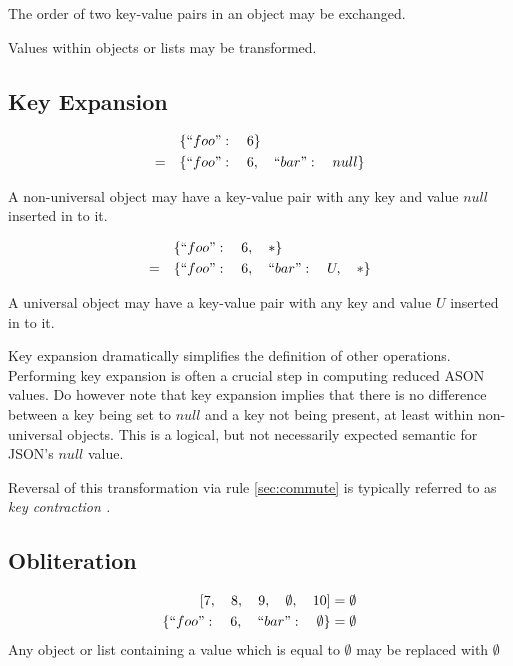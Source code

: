 \documentclass[letterpaper]{article}
\begin{document}
\begin{prule}
The order of two key-value pairs in an object may be exchanged.
\end{prule}

\begin{prule}
Values within objects or lists may be transformed.
\end{prule}

\subsection{Key Expansion}
\begin{prule}
\begin{equation}
\begin{split}
& \{``foo":\quad6 \}\\
= \quad& \{``foo":\quad6,\quad ``bar":\quad null\}
\end{split}
\end{equation}

A non-universal object may have a key-value pair with any key and value
\(null\) inserted in to it.
\end{prule}

\begin{prule}
\begin{equation}
\begin{split}
& \{``foo":\quad6,\quad *\}\\
= \quad& \{``foo":\quad6,\quad ``bar":\quad U,\quad *\}
\end{split}
\end{equation}

A universal object may have a key-value pair with any key and value \(U\)
inserted in to it.
\end{prule}

Key expansion dramatically simplifies the definition of other operations.
Performing key expansion is often a crucial step in computing reduced ASON
values. Do however note that key expansion implies that there is no difference
between a key being set to \(null\) and a key not being present, at least
within non-universal objects. This is a logical, but not necessarily expected
semantic for JSON's \(null\) value.

Reversal of this transformation via rule \ref{sec:commute} is typically
referred to as \em key contraction \em .

\subsection{Obliteration}
\begin{prule}
\label{sec:oblit}
\begin{equation}
\begin{split}
{[}7,\quad8,\quad9,\quad\emptyset,\quad10] & = \emptyset \\
\{``foo":\quad6,\quad``bar":\quad\emptyset\} & = \emptyset
\end{split}
\end{equation}
Any object or list containing a value which is equal to \(\emptyset\) may be
replaced with \(\emptyset\)
\end{prule}
\end{document}

